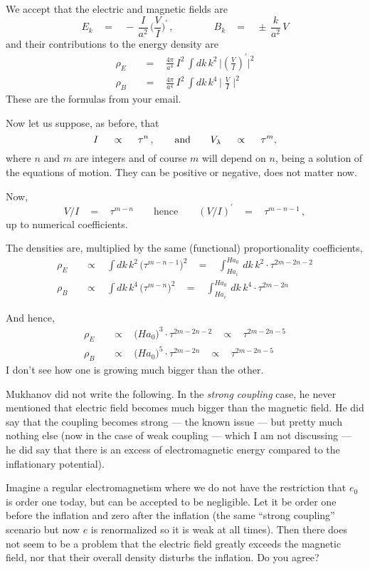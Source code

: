 \documentclass[12pt]{article}
\begin{document}
	We accept that the electric and magnetic fields are
\[
	E_k  ~~~~=~~~~  -\, \frac{I}{a^2}\, \bigg( \frac V I \bigg)^\prime\,,
	\qquad\qquad
	B_k  ~~~~=~~~~  \pm\, \frac{k}{a^2}\, V
\]
	and their contributions to the energy density are
\begin{align*}
%
	\rho_E  &  ~~~~=~~~~  \frac{4\pi}{a^4}\, I^2\, \int dk\, k^2\,  \bigg| \left(\frac V I \right)^\prime \bigg|^2
	\\
%
	\rho_B  &  ~~~~=~~~~  \frac{4\pi}{a^4}\, I^2\, \int dk\, k^4\,  \bigg|\; \frac V I \;\bigg|^2
\end{align*}
	These are the formulas from your email.

	Now let us suppose, as before, that
\[
	I  ~~~~\propto~~~~  \tau^n\,,
	\qquad
	\text{and}
	\qquad
	V_\lambda  ~~~~\propto~~~~  \tau^m\\,
\]
	where $ n $ and $ m $ are integers and of course $ m $ will depend on $ n $, being a solution of the equations of motion.
	They can be positive or negative, does not matter now.

	Now,
\[
	V/I  ~~~~=~~~~  \tau^{m-n}
	\qquad
	\text{hence}
	\qquad
	(V/I)^\prime  ~~~~=~~~~  \tau^{m-n-1}\,,
\]
	up to numerical coefficients.

	The densities are, multiplied by the same (functional) proportionality coefficients,
\begin{align*}
%
	\rho_E  & ~~~~\propto~~~~ \int dk\, k^2\, \big(\tau^{m-n-1}\big)^2  ~~~~=~~~~ \int_{Ha_i}^{Ha_0}\, dk\, k^2 \cdot \tau^{2m - 2n - 2} \\
%
	\rho_B  & ~~~~\propto~~~~ \int dk\, k^4\, \big(\tau^{m-n}\big)^2    ~~~~=~~~~ \int_{Ha_i}^{Ha_0}\, dk\, k^4 \cdot \tau^{2m - 2n}
\end{align*}

	And hence,
\begin{align*}
%
	\rho_E  & ~~~~\propto~~~~ \big(Ha_0\big)^3 \cdot \tau^{2m - 2n - 2}  ~~~~\propto~~~~  \tau^{2m-2n-5} \\
%
	\rho_B  & ~~~~\propto~~~~ \big(Ha_0\big)^5 \cdot \tau^{2m - 2n}  ~~~~\propto~~~~ \tau^{2m-2n-5}
\end{align*}
	I don't see how one is growing much bigger than the other.

\pagebreak
	Mukhanov did not write the following. 
	In the {\it strong coupling} case, he never mentioned that electric field becomes much bigger than the magnetic field.
	He did say that the coupling becomes strong --- the known issue --- but pretty much nothing else 
	(now in the case of weak coupling --- which I am not discussing --- he did say that there is an excess of electromagnetic energy
	compared to the inflationary potential). 
	
\vspace{8mm}
	Imagine a regular electromagnetism where we do not have the restriction that $ e_0 $ is order one today, but can be 
	accepted to be negligible.
	Let it be order one before the inflation and zero after the inflation 
	(the same ``strong coupling'' scenario but now $ e $  is renormalized so it is weak at all times).
	Then there does not seem to be a problem that the electric field greatly exceeds the magnetic field, 
	nor that their overall density disturbs the inflation.
	Do you agree?
\end{document}
